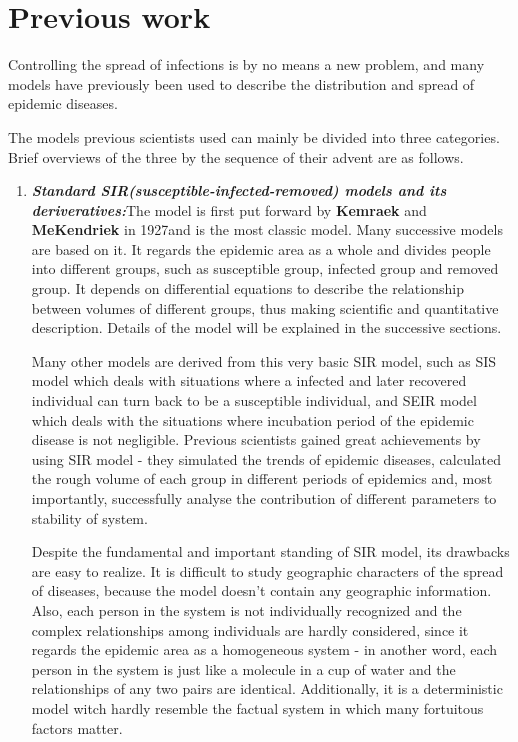 \section{Previous work}

Controlling the spread of infections is by no means a new problem, and many models have previously been used to describe the distribution and spread of epidemic diseases.

The models previous scientists used can mainly be divided into three categories. Brief overviews of the three by the sequence of their advent are as follows.
\begin{enumerate}
	\item \textbf{\emph{Standard SIR(susceptible-infected-removed) models and its deriveratives:}}The model is first put forward by \textbf{Kemraek} and \textbf{MeKendriek} in 1927\cite{SIR}and is the most classic model. Many successive models are based on it. It regards the epidemic area as a whole and divides people into different groups, such as susceptible group, infected group and removed group. It depends on differential equations to describe the relationship between volumes of different groups, thus making scientific and quantitative description. Details of the model will be explained in the successive sections.
	      \par Many other models are derived from this very basic SIR model, such as SIS model\cite{SIS} which deals with situations where a infected and later recovered individual can turn back to be a susceptible individual, and SEIR model\cite{SEIR} which deals with the situations where incubation period of the epidemic disease is not negligible. Previous scientists gained great achievements by using SIR model - they simulated the trends of epidemic diseases, calculated the rough volume of each group in different periods of epidemics and, most importantly, successfully analyse the contribution of different parameters to stability of system.
	      \par Despite the fundamental and important standing of SIR model, its drawbacks are easy to realize. It is difficult to study geographic characters of the spread of diseases, because the model doesn't contain any geographic information. Also, each person in the system is not individually recognized and the complex relationships among individuals are hardly considered, since it regards the epidemic area as a homogeneous system - in another word, each person in the system is just like a molecule in a cup of water and the relationships of any two pairs are identical. Additionally, it is a deterministic model witch hardly resemble the factual system in which many fortuitous factors matter.

\end{enumerate}

